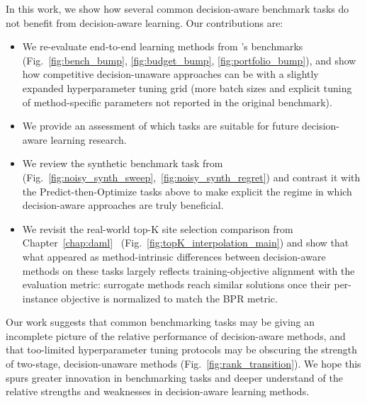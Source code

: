 In this work, we show how several common decision-aware benchmark tasks do not benefit from decision-aware learning. Our contributions are:
\begin{itemize}[leftmargin=*,noitemsep,topsep=0pt]
    \item We re-evaluate end-to-end learning methods from \citeauthor{gengBenchmarkingPtOPnO2024}'s benchmarks (Fig.~\ref{fig:bench_bump}, \ref{fig:budget_bump}, \ref{fig:portfolio_bump}), and show how competitive decision-unaware approaches can be with a slightly expanded hyperparameter tuning grid (more batch sizes and explicit tuning of method-specific parameters not reported in the original benchmark).
    \item We provide an assessment of which tasks are suitable for future decision-aware learning research.
    \item We review the synthetic benchmark task from ~\citet{huang2024decisionfocusedPG} (Fig.~\ref{fig:noisy_synth_sweep},~\ref{fig:noisy_synth_regret}) and contrast it with the Predict-then-Optimize tasks above to make explicit the regime in which decision-aware approaches are truly beneficial.
    \item We revisit the real-world top-K site selection comparison from Chapter~\ref{chap:daml}~\citep{heuton2025decisionaware} (Fig.~\ref{fig:topK_interpolation_main}) and show that what appeared as method-intrinsic differences between decision-aware methods on these tasks largely reflects training-objective alignment with the evaluation metric: surrogate methods reach similar solutions once their per-instance objective is normalized to match the BPR metric.

    
\end{itemize}
Our work suggests that common benchmarking tasks may be giving an incomplete picture of the relative performance of decision-aware methods, and that too-limited hyperparameter tuning protocols may be obscuring the strength of two-stage, decision-unaware methods (Fig.~\ref{fig:rank_transition}). We hope this spurs greater innovation in benchmarking tasks and deeper understand of the relative strengths and weaknesses in decision-aware learning methods.


